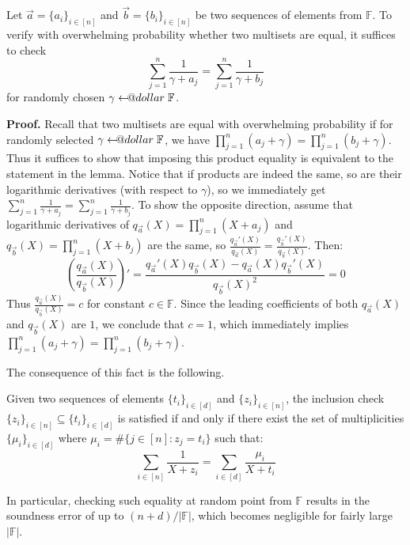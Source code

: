 \documentclass{lookup-template}
\makeatletter
\newcommand\leftarrowS{\leftarrow\joinrel\smalldollar}
\newcommand{\smalldollar}{\mathrel{\mathpalette\small@dollar\relax}}
\newcommand{\small@dollar}[2]{%
  \vcenter{\hbox{%
    $#1\textnormal{\fontsize{0.7\dimexpr\f@size pt}{0}\selectfont\$}$%
  }}%
}
\makeatother
\begin{document}
\begin{lemma}
    Let $\vec{a} = \{a_i\}_{i \in [n]}$ and $\vec{b} = \{b_i\}_{i \in [n]}$ be
    two sequences of elements from $\mathbb{F}$. To verify with overwhelming
    probability whether two multisets are equal, it suffices to check
    \begin{equation*}
        \sum_{j=1}^n \frac{1}{\gamma + a_j} = \sum_{j=1}^n \frac{1}{\gamma+b_j}
    \end{equation*}
    for randomly chosen $\gamma \leftarrowS \mathbb{F}$.
\end{lemma}

\textbf{Proof.} Recall that two multisets are equal with overwhelming
probability if for randomly selected $\gamma \leftarrowS \mathbb{F}$, we have
$\prod_{j=1}^n (a_j+\gamma) = \prod_{j=1}^n (b_j+\gamma)$. Thus it suffices to
show that imposing this product equality is equivalent to the statement in the
lemma. Notice that if products are indeed the same, so are their logarithmic
derivatives (with respect to $\gamma$), so we immediately get $\sum_{j=1}^n
\frac{1}{\gamma + a_j} = \sum_{j=1}^n \frac{1}{\gamma+b_j}$. To show the
opposite direction, assume that logarithmic derivatives of $q_{\vec{a}}(X) =
\prod_{j=1}^n (X+a_j)$ and $q_{\vec{b}}(X) = \prod_{j=1}^n (X+b_j)$ are the same,
so $\frac{q_{\vec{a}}'(X)}{q_{\vec{a}}(X)} = \frac{q_{\vec{b}}'(X)}{q_{\vec{b}}(X)}$. Then:
\begin{equation*}
    \left(\frac{q_{\vec{a}}(X)}{q_{\vec{b}}(X)}\right)' = \frac{q_{\vec{a}}'(X)q_{\vec{b}}(X)-q_{\vec{a}}(X)q_{\vec{b}}'(X)}{q_{\vec{b}}(X)^2}=0
\end{equation*}
Thus $\frac{q_{\vec{a}}(X)}{q_{\vec{b}}(X)}=c$ for constant $c \in \mathbb{F}$.
Since the leading coefficients of both $q_{\vec{a}}(X)$ and $q_{\vec{b}}(X)$ are
$1$, we conclude that $c=1$, which immediately implies $\prod_{j=1}^n
(a_j+\gamma) = \prod_{j=1}^n (b_j+\gamma)$.

The consequence of this fact is the following.

\begin{lemma}
    Given two sequences of elements $\{t_i\}_{i \in [d]}$ and $\{z_i\}_{i \in
    [n]}$, the inclusion check $\{z_i\}_{i \in [n]} \subseteq \{t_i\}_{i \in
    [d]}$ is satisfied if and only if there exist the set of multiplicities
    $\{\mu_i\}_{i \in [d]}$ where $\mu_i = \#\{j \in [n]: z_j = t_i\}$ such that:
    \begin{equation*}
        \sum_{i \in [n]} \frac{1}{X+z_i} = \sum_{i \in [d]} \frac{\mu_i}{X+t_i}
    \end{equation*}

    In particular, checking such equality at random point from $\mathbb{F}$
    results in the soundness error of up to $(n+d)/|\mathbb{F}|$, which becomes
    negligible for fairly large $|\mathbb{F}|$.
\end{lemma}
\end{document}
